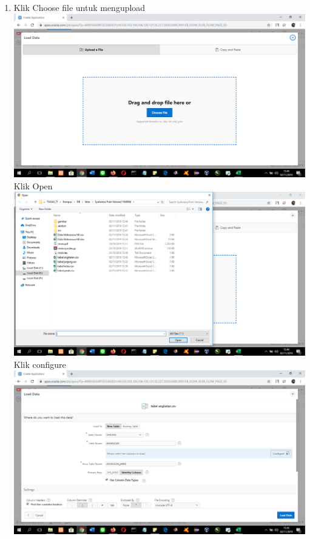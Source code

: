 \begin{enumerate}
\item Klik Choose file untuk mengupload\\
\includegraphics[scale= 0.3]{gambar/gambar8.png}\\
Klik Open\\
\includegraphics[scale= 0.3]{gambar/gambar9.png}\\
Klik configure\\
\includegraphics[scale= 0.3]{gambar/gambar10.png}\\

\end{enumerate}
